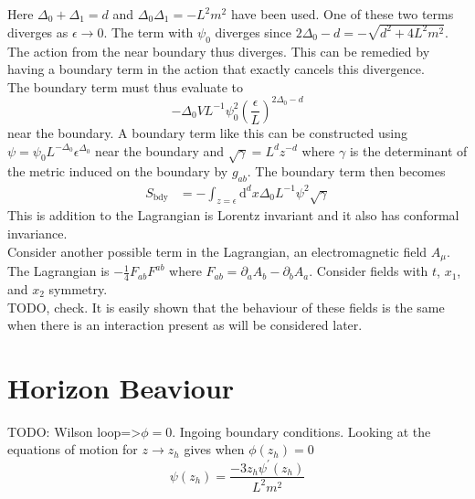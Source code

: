 \documentclass[12pt]{report}
\renewcommand{\d}{\ensuremath{\mathrm{d}}}
\begin{document}
Here $\Delta_0+\Delta_1=d$ and $\Delta_0\Delta_1=-L^2m^2$ have been used. One of these two terms diverges as $\epsilon\rightarrow0$. The term with $\psi_0$ diverges since $2\Delta_0-d=-\sqrt{d^2+4L^2m^2}$. The action from the near boundary thus diverges. This can be remedied by having a boundary term in the action that exactly cancels this divergence.\\
The boundary term must thus evaluate to
\begin{equation}
-\Delta_0VL^{-1}\psi_0^2\left(\frac{\epsilon}{L}\right)^{2\Delta_0-d}
\end{equation}
near the boundary. A boundary term like this can be constructed using $\psi=\psi_0L^{-\Delta_0}\epsilon^{\Delta_0}$ near the boundary and $\sqrt{\gamma}=L^dz^{-d}$ where $\gamma$ is the determinant of the metric induced on the boundary by $g_{ab}$.
The boundary term then becomes
\begin{equation}
\begin{split}
 S_{\mathrm{bdy}}&=-\int_{z=\epsilon}\d^dx\Delta_0L^{-1}\psi^2\sqrt{\gamma}
\label{Sbdy}
\end{split}
\end{equation}
This is addition to the Lagrangian is Lorentz invariant and it also has conformal invariance.
\\
Consider another possible term in the Lagrangian, an electromagnetic field $A_\mu$. The Lagrangian is $-\frac{1}{4}F_{ab}F^{ab}$ where $F_{ab}=\partial_aA_b-\partial_bA_a$. Consider fields with $t$, $x_1$, and $x_2$ symmetry.
\\
TODO, check. It is easily shown that the behaviour of these fields is the same when there is an interaction present as will be considered later.
\section{Horizon Beaviour}
TODO: Wilson loop=>$\phi=0$. Ingoing boundary conditions.
Looking at the equations of motion for $z\rightarrow z_h$ gives when $\phi(z_h)=0$
\begin{equation}
 \psi(z_h)=\frac{-3z_h\psi^\prime(z_h)}{L^2m^2}
\end{equation}
\end{document}
